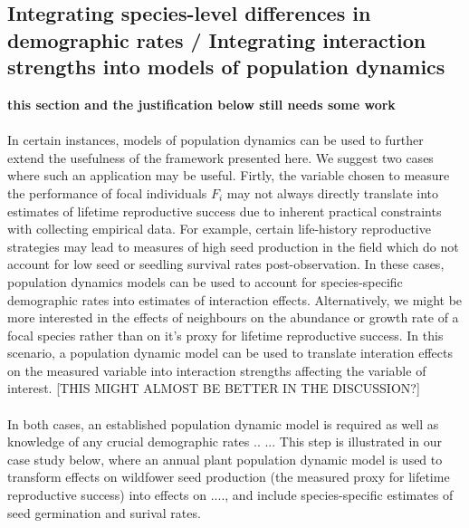 \documentclass[a4,12pt]{article}
\begin{document}
    \subsection{Integrating species-level differences in demographic rates / Integrating interaction strengths into models of population dynamics}

    \textbf{this section and the justification below still needs some work}

        \paragraph{}
        In certain instances, models of population dynamics can be used to further extend the usefulness of the framework presented here. We suggest two cases where such an application may be useful. Firtly, the variable chosen to measure the performance of focal individuals $F_i$ may not always directly translate into estimates of lifetime reproductive success due to inherent practical constraints with collecting empirical data. For example, certain life-history reproductive strategies may lead to measures of high seed production in the field which do not account for low seed or seedling survival rates post-observation. In these cases, population dynamics models can be used to account for species-specific demographic rates into estimates of interaction effects. Alternatively, we might be more interested in the effects of neighbours on the abundance or growth rate of a focal species rather than on it's proxy for lifetime reproductive success. In this scenario, a population dynamic model can be used to translate interation effects on the measured variable into interaction strengths affecting the variable of interest. [THIS MIGHT ALMOST BE BETTER IN THE DISCUSSION?]

        \paragraph{}
        In both cases, an established population dynamic model is required as well as knowledge of any crucial demographic rates ..
        ... This step is illustrated in our case study below, where an annual plant population dynamic model is used to transform effects on wildfower seed production (the measured proxy for lifetime reproductive success) into effects on ...., and include species-specific estimates of seed germination and surival rates. 

    
\end{document}
